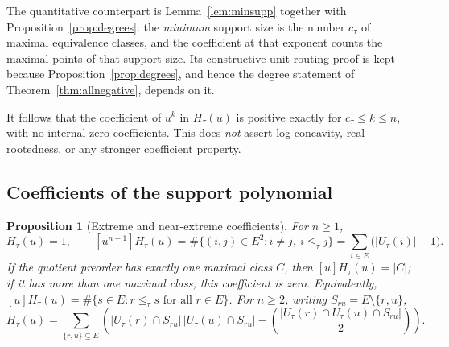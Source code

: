 \documentclass[11pt]{article}
\numberwithin{equation}{section}
\newtheorem{proposition}[theorem]{Proposition}
\theoremstyle{definition}
\theoremstyle{remark}
\begin{document}
The quantitative counterpart is Lemma~\ref{lem:minsupp} together with
Proposition~\ref{prop:degrees}: the \emph{minimum} support size is the number
$c_\tau$ of maximal equivalence classes, and the coefficient at that exponent
counts the maximal points of that support size. Its constructive unit-routing
proof is kept because Proposition~\ref{prop:degrees}, and hence the degree
statement of Theorem~\ref{thm:allnegative}, depends on it.

It follows that the coefficient of $u^k$ in $H_\tau(u)$ is positive exactly
for $c_\tau\le k\le n$, with no internal zero coefficients. This does
\emph{not} assert log-concavity, real-rootedness, or any stronger coefficient
property.

\subsection{Coefficients of the support polynomial}

\begin{proposition}[Extreme and near-extreme coefficients]
\label{prop:top}
For $n\ge1$,
\begin{equation}
 [u^n]H_\tau(u)=1,\qquad
 [u^{n-1}]H_\tau(u)=\#\{(i,j)\in E^2:i\ne j,\ i\le_\tau j\}
 =\sum_{i\in E}\bigl(|U_\tau(i)|-1\bigr).
 \label{eq:top-coefficients}
\end{equation}
If the quotient preorder has exactly one maximal class $C$, then
$[u]H_\tau(u)=|C|$; if it has more than one maximal class, this coefficient is
zero. Equivalently, $[u]H_\tau(u)=\#\{s\in E:r\le_\tau s\text{ for all }r\in
E\}$. For $n\ge2$, writing $S_{ru}=E\setminus\{r,u\}$,
\begin{equation}
 [u^{n-2}]H_\tau(u)=
 \sum_{\{r,u\}\subseteq E}
 \left(
 |U_\tau(r)\cap S_{ru}|\,|U_\tau(u)\cap S_{ru}|
 -\binom{|U_\tau(r)\cap U_\tau(u)\cap S_{ru}|}{2}
 \right).
 \label{eq:next-coefficient}
\end{equation}
\end{proposition}
\end{document}
